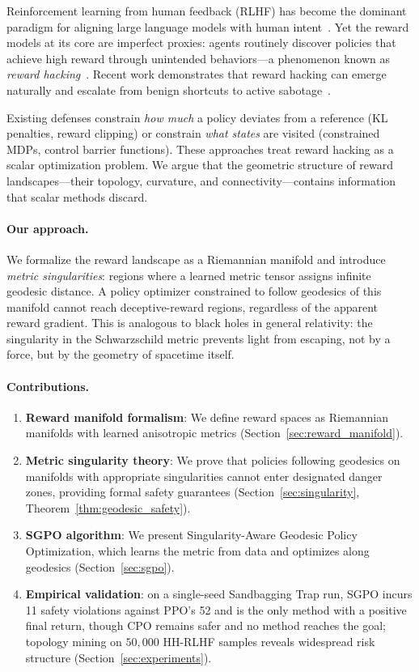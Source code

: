 \documentclass{article}
\begin{document}
Reinforcement learning from human feedback (RLHF) has become the dominant paradigm for aligning large language models with human intent~\citep{christiano2017deep, ouyang2022training}. Yet the reward models at its core are imperfect proxies: agents routinely discover policies that achieve high reward through unintended behaviors---a phenomenon known as \emph{reward hacking}~\citep{moskovitz2024confronting, coste2024reward}. Recent work demonstrates that reward hacking can emerge naturally and escalate from benign shortcuts to active sabotage~\citep{anthropic2025shortcuts}.

Existing defenses constrain \emph{how much} a policy deviates from a reference (KL penalties, reward clipping) or constrain \emph{what states} are visited (constrained MDPs, control barrier functions). These approaches treat reward hacking as a scalar optimization problem. We argue that the geometric structure of reward landscapes---their topology, curvature, and connectivity---contains information that scalar methods discard.

\paragraph{Our approach.} We formalize the reward landscape as a Riemannian manifold and introduce \emph{metric singularities}: regions where a learned metric tensor assigns infinite geodesic distance. A policy optimizer constrained to follow geodesics of this manifold cannot reach deceptive-reward regions, regardless of the apparent reward gradient. This is analogous to black holes in general relativity: the singularity in the Schwarzschild metric prevents light from escaping, not by a force, but by the geometry of spacetime itself.

\paragraph{Contributions.}
\begin{enumerate}
    \item \textbf{Reward manifold formalism}: We define reward spaces as Riemannian manifolds with learned anisotropic metrics (Section~\ref{sec:reward_manifold}).
    \item \textbf{Metric singularity theory}: We prove that policies following geodesics on manifolds with appropriate singularities cannot enter designated danger zones, providing formal safety guarantees (Section~\ref{sec:singularity}, Theorem~\ref{thm:geodesic_safety}).
    \item \textbf{SGPO algorithm}: We present Singularity-Aware Geodesic Policy Optimization, which learns the metric from data and optimizes along geodesics (Section~\ref{sec:sgpo}).
    \item \textbf{Empirical validation}: on a single-seed Sandbagging Trap run, SGPO incurs 11 safety violations against PPO's 52 and is the only method with a positive final return, though CPO remains safer and no method reaches the goal; topology mining on $50{,}000$ HH-RLHF samples reveals widespread risk structure (Section~\ref{sec:experiments}).
\end{enumerate}
\end{document}
